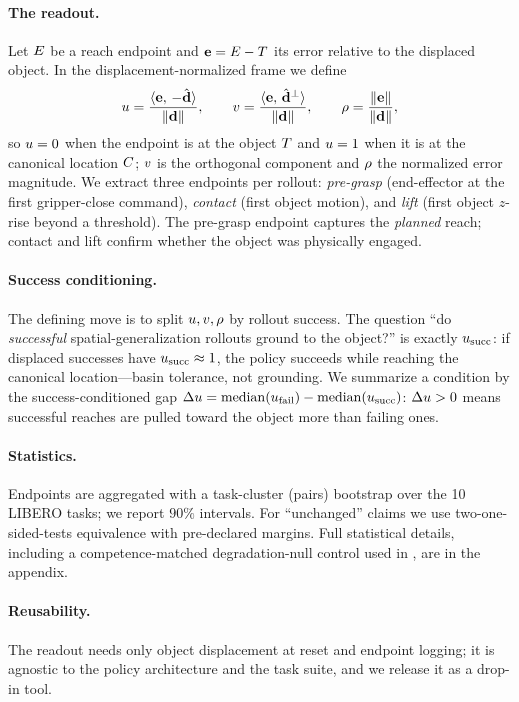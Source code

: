\paragraph{The readout.}
Let $E$ be a reach endpoint and $\mathbf{e} = E - T$ its error relative to the
displaced object. In the displacement-normalized frame we define
\begin{equation}
u = \frac{\langle \mathbf{e},\, -\hat{\mathbf{d}}\rangle}{\|\mathbf{d}\|},
\qquad
v = \frac{\langle \mathbf{e},\, \hat{\mathbf{d}}^{\perp}\rangle}{\|\mathbf{d}\|},
\qquad
\rho = \frac{\|\mathbf{e}\|}{\|\mathbf{d}\|},
\end{equation}
so $u = 0$ when the endpoint is at the object $T$ and $u = 1$ when it is at the
canonical location $C$; $v$ is the orthogonal component and $\rho$ the normalized
error magnitude. We extract three endpoints per rollout: \emph{pre-grasp} (end-effector at
the first gripper-close command), \emph{contact} (first object motion), and \emph{lift}
(first object $z$-rise beyond a threshold). The pre-grasp endpoint captures the
\emph{planned} reach; contact and lift confirm whether the object was physically engaged.

\paragraph{Success conditioning.}
The defining move is to split $u,v,\rho$ by rollout success. The question ``do
\emph{successful} spatial-generalization rollouts ground to the object?'' is exactly
$u_{\mathrm{succ}}$: if displaced successes have $u_{\mathrm{succ}} \approx 1$, the policy succeeds while reaching
the canonical location---basin tolerance, not grounding. We summarize a condition by the
success-conditioned gap $\Delta u = \mathrm{median}(u_{\mathrm{fail}}) - \mathrm{median}(u_{\mathrm{succ}})$:
$\Delta u > 0$ means successful reaches are pulled toward the object more than failing ones.

\paragraph{Statistics.}
Endpoints are aggregated with a task-cluster (pairs) bootstrap over the 10 LIBERO tasks;
we report $90\%$ intervals. For ``unchanged'' claims we use two-one-sided-tests
equivalence with pre-declared margins. Full statistical details, including a
competence-matched degradation-null control used in , are in the
appendix.

\paragraph{Reusability.}
The readout needs only object displacement at reset and endpoint logging; it is agnostic
to the policy architecture and the task suite, and we release it as a drop-in tool.
